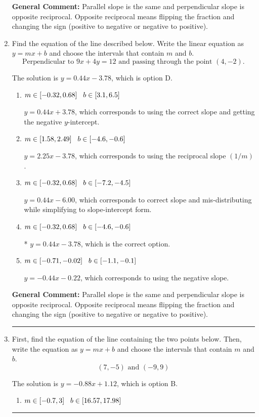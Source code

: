 \documentclass{extbook}[14pt]
\newcommand{\litem}[1]{\item #1

\rule{\textwidth}{0.4pt}}
\begin{document}
\begin{enumerate}
{\textbf{General Comment:} Parallel slope is the same and perpendicular slope is opposite reciprocal. Opposite reciprocal means flipping the fraction and changing the sign (positive to negative or negative to positive).
}
\litem{
Find the equation of the line described below. Write the linear equation as $ y=mx+b $ and choose the intervals that contain $m$ and $b$.
\[ \text{Perpendicular to } 9 x + 4 y = 12 \text{ and passing through the point } (4, -2). \]

The solution is \( y = 0.44x - 3.78 \), which is option D.\begin{enumerate}[label=\Alph*.]
\item \( m \in [-0.32, 0.68] \hspace*{3mm} b \in [3.1, 6.5] \)

 $y = 0.44x + 3.78$, which corresponds to using the correct slope and getting the negative $y$-intercept.
\item \( m \in [1.58, 2.49] \hspace*{3mm} b \in [-4.6, -0.6] \)

 $y = 2.25x - 3.78$, which corresponds to using the reciprocal slope $(1/m)$.
\item \( m \in [-0.32, 0.68] \hspace*{3mm} b \in [-7.2, -4.5] \)

 $y = 0.44x - 6.00$, which corresponds to correct slope and mis-distributing while simplifying to slope-intercept form.
\item \( m \in [-0.32, 0.68] \hspace*{3mm} b \in [-4.6, -0.6] \)

* $y = 0.44x - 3.78$, which is the correct option.
\item \( m \in [-0.71, -0.02] \hspace*{3mm} b \in [-1.1, -0.1] \)

 $y = -0.44x - 0.22$, which corresponds to using the negative slope.
\end{enumerate}

\textbf{General Comment:} Parallel slope is the same and perpendicular slope is opposite reciprocal. Opposite reciprocal means flipping the fraction and changing the sign (positive to negative or negative to positive).
}
\litem{
First, find the equation of the line containing the two points below. Then, write the equation as $ y=mx+b $ and choose the intervals that contain $m$ and $b$.
\[ (7, -5) \text{ and } (-9, 9) \]

The solution is \( y = -0.88x + 1.12 \), which is option B.\begin{enumerate}[label=\Alph*.]
\item \( m \in [-0.7, 3] \hspace*{3mm} b \in [16.57, 17.98] \)


\end{enumerate}}
\end{enumerate}
\end{document}
